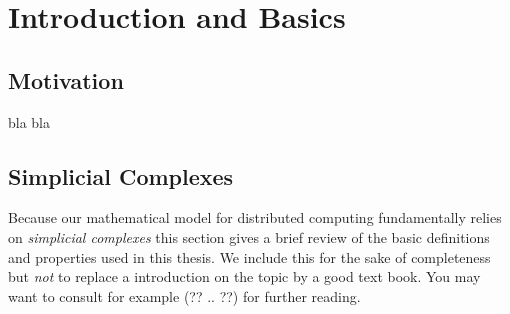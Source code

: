 \chapter{Introduction and Basics}
%
\section{Motivation}
bla bla  %


\section{Simplicial Complexes}
Because our mathematical model for distributed computing fundamentally relies on
\emph{simplicial complexes} this section gives a brief review of the basic
definitions and properties used in this thesis. We include this for
the sake of completeness but \emph{not} to replace a introduction on the topic
by a good text book.  You may want to consult for example (?? .. ??) %
for further reading.
 
